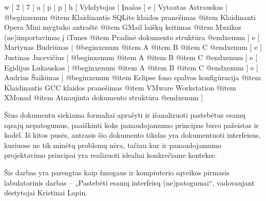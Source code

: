 
\xtable
{
  w [ 2  | 7 ]
  a [ p  | p ]
  h [ Vykdytojas | Įnašas ]
  e [ Vytautas Astrauskas 
  | @begin{xenum} 
      @item Klaidinantis SQLite klaidos pranešimas 
      @item Klaidinanti Opera Mini mygtuko antraštė 
      @item GMail laiškų keitimas 
      @item Muzikos (ne)importavimas į iTunes 
      @item Pradinė dokumento struktūra
    @end{xenum}
  ]
  e [ Martynas Budriūnas
  | @begin{xenum} 
      @item A
      @item B
      @item C
    @end{xenum}
  ]
  e [ Justinas Jucevičius 
  | @begin{xenum} 
      @item A
      @item B
      @item C
    @end{xenum}
  ]
  e [ Egidijus Lukauskas 
  | @begin{xenum} 
      @item A
      @item B
      @item C
    @end{xenum}
  ]
  e [ Audrius Šaikūnas 
  | @begin{xenum} 
      @item Eclipse fono spalvos konfigūracija 
      @item Klaidinantis GCC klaidos pranešimas 
      @item VMware Workstation 
      @item XMonad
      @item Atnaujinta dokumento struktūra
    @end{xenum}
  ]
}

Šiuo dokumentu siekiama formaliai aprašyti ir išanalizuoti pastebėtus esamų sąsajų nepatogumus,
paaiškinti koks panaudojamumo principas buvo pažeistas ir kodėl. Iš kitos pusės, antrasis šio
dokumento tikslas yra dokumentuoti interfeisus, kuriuose ne tik minėtų problemų nėra, tačiau kur
ir panaudojamumo projektavimo principai yra realizuoti idealiai konkrečiame kontekse.

Šis darbas yra parengtas kaip žmogaus ir kompiuterio sąveikos pirmasis labulatorinis darbas
– „Pastebėti esamų interfeisų (ne)patogumai“, vadovaujant dėstytojai Kristinai Lapin.
